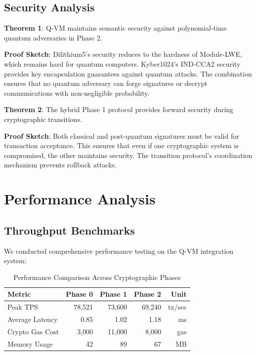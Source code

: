 \documentclass[11pt]{article}
\begin{document}
\subsection{Security Analysis}

\textbf{Theorem 1}: Q-VM maintains semantic security against polynomial-time quantum adversaries in Phase 2.

\textbf{Proof Sketch}: Dilithium5's security reduces to the hardness of Module-LWE, which remains hard for quantum computers. Kyber1024's IND-CCA2 security provides key encapsulation guarantees against quantum attacks. The combination ensures that no quantum adversary can forge signatures or decrypt communications with non-negligible probability.

\textbf{Theorem 2}: The hybrid Phase 1 protocol provides forward security during cryptographic transitions.

\textbf{Proof Sketch}: Both classical and post-quantum signatures must be valid for transaction acceptance. This ensures that even if one cryptographic system is compromised, the other maintains security. The transition protocol's coordination mechanism prevents rollback attacks.

\section{Performance Analysis}

\subsection{Throughput Benchmarks}

We conducted comprehensive performance testing on the Q-VM integration system:

\begin{table}[htbp]
\centering
\begin{tabular}{@{}lrrrr@{}}
\toprule
\textbf{Metric} & \textbf{Phase 0} & \textbf{Phase 1} & \textbf{Phase 2} & \textbf{Unit} \\
\midrule
Peak TPS & 78,521 & 73,600 & 69,240 & tx/sec \\
Average Latency & 0.85 & 1.02 & 1.18 & ms \\
Crypto Gas Cost & 3,000 & 11,000 & 8,000 & gas \\
Memory Usage & 42 & 89 & 67 & MB \\
\bottomrule
\end{tabular}
\caption{Performance Comparison Across Cryptographic Phases}
\label{tab:performance}
\end{table}
\end{document}
